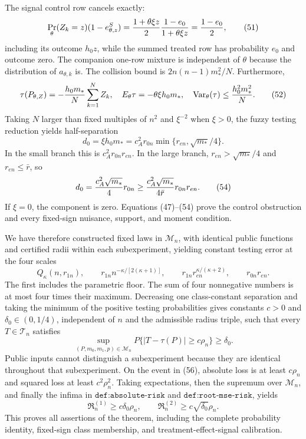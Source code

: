 The signal control row cancels exactly:
\[
\Pr_\theta(Z_k=z)(1-e^S_{\theta,z})
={1+\theta\xi z\over2}{1-e_0\over1+\theta\xi z}
={1-e_0\over2},                                                          \tag{51}
\]
including its outcome \(h_0z\), while the summed treated row has probability \(e_0\) and outcome zero.  The companion one-row mixture is independent of \(\theta\) because the distribution of \(a_{\theta,k}\) is.  The collision bound is \(2n(n-1)m_*^2/N\).  Furthermore,
\[
\tau(P_{\theta,Z})=-{h_0m_*\over N}\sum_{k=1}^NZ_k,\quad
E_\theta\tau=-\theta\xi h_0m_*,\quad
\operatorname{Var}_\theta(\tau)\leq {h_0^2m_*^2\over N}.                \tag{52}
\]
Taking \(N\) larger than fixed multiples of \(n^2\) and \(\xi^{-2}\) when \(\xi>0\), the fuzzy testing reduction yields half-separation
\[
d_0=\xi h_0m_*
=c_A^2r_{0n}\min\{r_{en},\sqrt{m_*}/4\}.                                \tag{53}
\]
In the small branch this is \(c_A^2r_{0n}r_{en}\).  In the large branch, \(r_{en}>\sqrt{m_*}/4\) and \(r_{en}\leq\bar r\), so
\[
d_0={c_A^2\sqrt{m_*}\over4}r_{0n}
\geq {c_A^2\sqrt{m_*}\over4\bar r}r_{0n}r_{en}.                         \tag{54}
\]
If \(\xi=0\), the component is zero.  Equations (47)--(54) prove the control obstruction and every fixed-sign nuisance, support, and moment condition.

We have therefore constructed fixed laws in \(\mathcal M_n\), with identical public functions and certified radii within each subexperiment, yielding constant testing error at the four scales
\[
Q_\kappa(n,r_{1n}),\qquad
r_{1n}n^{-\kappa/[2(\kappa+1)]},\qquad
r_{1n}r_{en}^{\kappa/(\kappa+2)},\qquad
r_{0n}r_{en}.                                                            \tag{55}
\]
The first includes the parametric floor.  The sum of four nonnegative numbers is at most four times their maximum.  Decreasing one class-constant separation and taking the minimum of the positive testing probabilities gives constants \(c>0\) and \(\delta_0\in(0,1/4)\), independent of \(n\) and the admissible radius triple, such that every \(T\in\mathcal T_n\) satisfies
\[
\sup_{(P,m_0,m_1,p)\in\mathcal M_n}
P\{|T-\tau(P)|\geq c\rho_n\}\geq\delta_0.                             \tag{56}
\]
Public inputs cannot distinguish a subexperiment because they are identical throughout that subexperiment.  On the event in (56), absolute loss is at least \(c\rho_n\) and squared loss at least \(c^2\rho_n^2\).  Taking expectations, then the supremum over \(\mathcal M_n\), and finally the infima in \(\texttt{def:absolute-risk}\) and \(\texttt{def:root-mse-risk}\), yields
\[
\mathfrak R_n^{(1)}\geq c\delta_0\rho_n,\qquad
\mathfrak R_n^{(2)}\geq c\sqrt{\delta_0}\rho_n.
\]
This proves all assertions of the theorem, including the complete probability identity, fixed-sign class membership, and treatment-effect-signal calibration.


